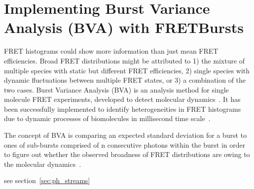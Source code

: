 \section{Implementing Burst Variance Analysis (BVA) with FRETBursts}

FRET histograms could show more information than just mean FRET efficiencies. Broad FRET distributions might be attributed to 1) the mixture of multiple species with static but different FRET efficiencies, 2) single species with dynamic fluctuations between multiple FRET states, or 3) a combination of the two cases. Burst Variance Analysis (BVA) is an analysis method for single molecule FRET experiments, developed to detect molecular dynamics~\cite{Torella_2011}. It has been successfully implemented to identify heterogeneities in FRET histograms due to dynamic processes of biomolecules in millisecond time scale~\cite{Torella_2011, Robb_2013}.

The concept of BVA is comparing an expected standard deviation for a burst to ones of sub-bursts comprised of n consecutive photons within the burst in order to figure out whether the observed broadness of FRET distributions are owing to the molecular dynamics~\cite{Torella_2011}. 

see section~\ref{sec:ph_streams}